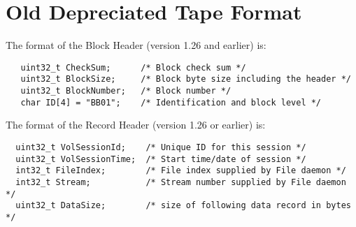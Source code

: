 \section{Old Depreciated Tape Format}

The format of the Block Header (version 1.26 and earlier) is: 

\footnotesize
\begin{verbatim}
   uint32_t CheckSum;      /* Block check sum */
   uint32_t BlockSize;     /* Block byte size including the header */
   uint32_t BlockNumber;   /* Block number */
   char ID[4] = "BB01";    /* Identification and block level */
\end{verbatim}
\normalsize

The format of the Record Header (version 1.26 or earlier) is: 

\footnotesize
\begin{verbatim}
  uint32_t VolSessionId;    /* Unique ID for this session */
  uint32_t VolSessionTime;  /* Start time/date of session */
  int32_t FileIndex;        /* File index supplied by File daemon */
  int32_t Stream;           /* Stream number supplied by File daemon */
  uint32_t DataSize;        /* size of following data record in bytes */
\end{verbatim}
\normalsize

